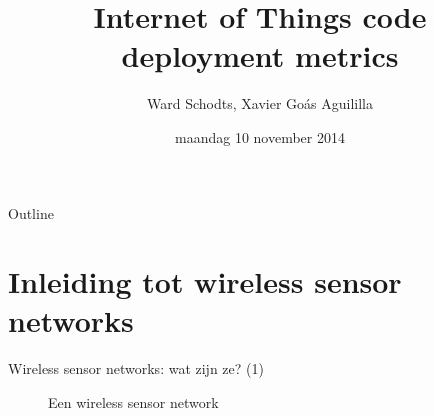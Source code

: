 \documentclass[presentation, bigger]{beamer}
\author{Ward Schodts, Xavier Goás Aguililla}
\date{maandag 10 november 2014}
\title{Internet of Things code deployment metrics}
\begin{document}
\maketitle
\begin{frame}[noframenumbering]{Outline}
  \tableofcontents
\end{frame}



\section{Inleiding tot wireless sensor networks}
\label{sec-1}
\begin{frame}[label=sec-1-1]{Wireless sensor networks: wat zijn ze? (1)}

  \begin{figure}
    \caption{Een wireless sensor network}
  \end{figure}

\end{frame}
\end{document}
